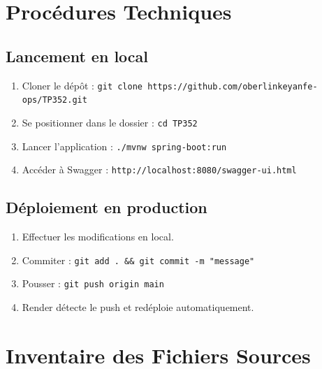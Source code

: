 \documentclass[12pt,a4paper]{article}
\begin{document}
\section{Procédures Techniques}

\subsection{Lancement en local}

\begin{enumerate}
    \item Cloner le dépôt : \texttt{git clone https://github.com/oberlinkeyanfe-ops/TP352.git}
    \item Se positionner dans le dossier : \texttt{cd TP352}
    \item Lancer l'application : \texttt{./mvnw spring-boot:run}
    \item Accéder à Swagger : \texttt{http://localhost:8080/swagger-ui.html}
\end{enumerate}

\subsection{Déploiement en production}

\begin{enumerate}
    \item Effectuer les modifications en local.
    \item Commiter : \texttt{git add . \&\& git commit -m "message"}
    \item Pousser : \texttt{git push origin main}
    \item Render détecte le push et redéploie automatiquement.
\end{enumerate}

\section{Inventaire des Fichiers Sources}
\end{document}
